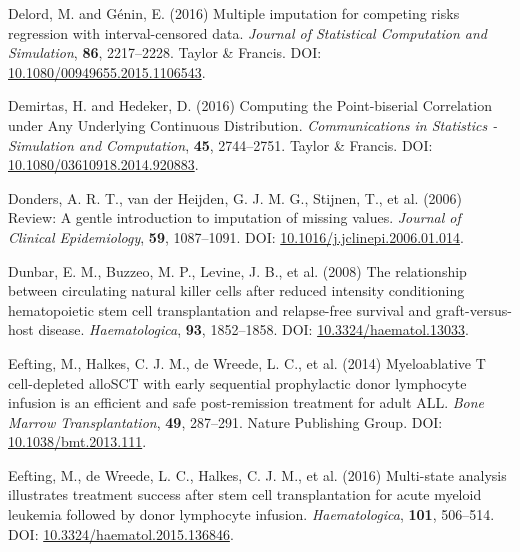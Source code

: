\documentclass[
  letterpaper,
  DIV=11,
  numbers=noendperiod]{scrreprt}
\newlength{\cslhangindent}
\newlength{\cslentryspacingunit} %
\newenvironment{CSLReferences}[2] %
 {%
  \setlength{\parindent}{0pt}
  \ifodd #1
  \let\oldpar\par
  \def\par{\hangindent=\cslhangindent\oldpar}
  \fi
  \setlength{\parskip}{#2\cslentryspacingunit}
 }%
 {}
\begin{document}
\begin{CSLReferences}{1}{0}
\leavevmode{}%
Delord, M. and Génin, E. (2016) Multiple imputation for competing risks
regression with interval-censored data. \emph{Journal of Statistical
Computation and Simulation}, \textbf{86}, 2217--2228. Taylor \& Francis.
DOI:
\href{https://doi.org/10.1080/00949655.2015.1106543}{10.1080/00949655.2015.1106543}.

\leavevmode{}%
Demirtas, H. and Hedeker, D. (2016) Computing the {Point-biserial
Correlation} under {Any Underlying Continuous Distribution}.
\emph{Communications in Statistics - Simulation and Computation},
\textbf{45}, 2744--2751. Taylor \& Francis. DOI:
\href{https://doi.org/10.1080/03610918.2014.920883}{10.1080/03610918.2014.920883}.

\leavevmode{}%
Donders, A. R. T., van der Heijden, G. J. M. G., Stijnen, T., et al.
(2006) Review: {A} gentle introduction to imputation of missing values.
\emph{Journal of Clinical Epidemiology}, \textbf{59}, 1087--1091. DOI:
\href{https://doi.org/10.1016/j.jclinepi.2006.01.014}{10.1016/j.jclinepi.2006.01.014}.

\leavevmode{}%
Dunbar, E. M., Buzzeo, M. P., Levine, J. B., et al. (2008) The
relationship between circulating natural killer cells after reduced
intensity conditioning hematopoietic stem cell transplantation and
relapse-free survival and graft-versus-host disease.
\emph{Haematologica}, \textbf{93}, 1852--1858. DOI:
\href{https://doi.org/10.3324/haematol.13033}{10.3324/haematol.13033}.

\leavevmode{}%
Eefting, M., Halkes, C. J. M., de Wreede, L. C., et al. (2014)
Myeloablative {T} cell-depleted {alloSCT} with early sequential
prophylactic donor lymphocyte infusion is an efficient and safe
post-remission treatment for adult {ALL}. \emph{Bone Marrow
Transplantation}, \textbf{49}, 287--291. Nature Publishing Group. DOI:
\href{https://doi.org/10.1038/bmt.2013.111}{10.1038/bmt.2013.111}.

\leavevmode{}%
Eefting, M., de Wreede, L. C., Halkes, C. J. M., et al. (2016)
Multi-state analysis illustrates treatment success after stem cell
transplantation for acute myeloid leukemia followed by donor lymphocyte
infusion. \emph{Haematologica}, \textbf{101}, 506--514. DOI:
\href{https://doi.org/10.3324/haematol.2015.136846}{10.3324/haematol.2015.136846}.


\end{CSLReferences}
\end{document}
